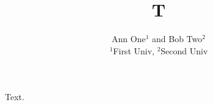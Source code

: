 \documentclass{IEEEtran}
\title{T}
\author{Ann One$^{1}$ and Bob Two$^{2}$\\ $^1$First Univ, $^2$Second Univ}
\begin{document}
\maketitle
Text.
\end{document}
